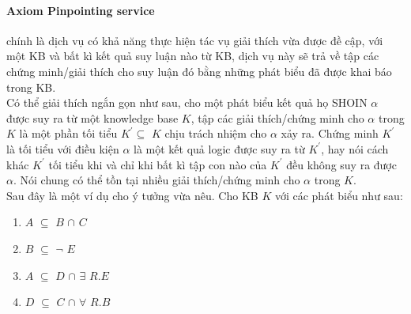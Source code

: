 \paragraph{Axiom Pinpointing service} chính là dịch vụ có khả năng thực hiện tác vụ giải thích vừa được đề cập, với một KB và bất kì kết quả suy luận nào từ KB, dịch vụ này sẽ trả về tập các chứng minh/giải thích cho suy luận đó bằng những phát biểu đã được khai báo trong KB.
\\
\hspace*{0.05\textwidth} Có thể giải thích ngắn gọn như sau, cho một phát biểu kết quả họ SHOIN $\alpha$ được suy ra từ một knowledge base $K$, tập các giải thích/chứng minh cho $\alpha$  trong $K$ là một phần tối tiểu $K^{'}\subseteq$ $K$ chịu trách nhiệm cho $\alpha$ xảy ra. Chứng minh $K^{'}$ là tối tiểu với điều kiện $\alpha$ là một kết quả logic được suy ra từ $K^{'}$, hay nói cách khác $K^{'}$ tối tiểu khi và chỉ khi bất kì tập con nào của $K^{'}$ đều không suy ra được $\alpha$. Nói chung có thể tồn tại nhiều giải thích/chứng minh cho $\alpha$ trong $K$.
\\
\hspace*{0.05\textwidth} Sau đây là một ví dụ cho ý tưởng vừa nêu. Cho KB $K$ với các phát biểu như sau:
\begin{enumerate}
\item	$A$ $\subseteq$ $B$ $\cap$ $C$ 
\item	$B$ $\subseteq$ $\neg$ $E$
\item	$A$ $\subseteq$ $D$ $\cap$ $\exists$ $R.E$ 
\item	$D$ $\subseteq$ $C$ $\cap$ $\forall$ $R.B$
\end{enumerate}

